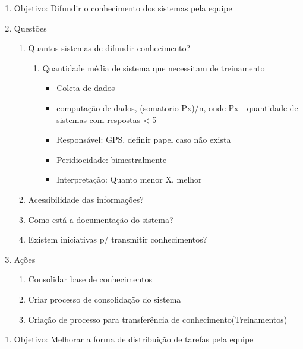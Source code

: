 \documentclass{article}
\begin{document}
	\begin{enumerate}
	\item Objetivo: Difundir o conhecimento dos sistemas pela equipe
	\item Questões
		\begin{enumerate}
		\item Quantos sistemas de difundir conhecimento?
			\begin{enumerate}
			\item Quantidade média de sistema que necessitam de treinamento
				\begin{itemize}
				\item Coleta de dados
				\item computação de dados, (somatorio Px)/n, onde Px - quantidade de sistemas com respostas < 5
				\item Responsável: GPS, definir papel caso não exista
				\item Peridiocidade: bimestralmente
				\item Interpretação: Quanto menor X, melhor
				\end{itemize}
			\end{enumerate}
		\item Acessibilidade das informações?
		\item Como está a documentação do sistema?
		\item Existem iniciativas p/ transmitir conhecimentos?		
		\end{enumerate}
	\item Ações
		\begin{enumerate}
		\item Consolidar base de conhecimentos
		\item Criar processo de consolidação do sistema
		\item Criação de processo para transferência de conhecimento(Treinamentos)
		\end{enumerate}
	\end{enumerate}
	
	\begin{enumerate}
	\item Objetivo: Melhorar a forma de distribuição de tarefas pela equipe
	
	\end{enumerate}
\end{document}
